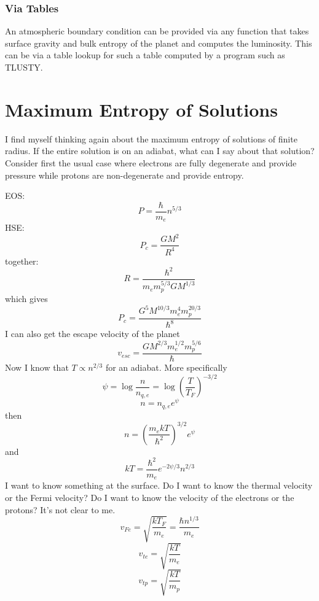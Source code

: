 \documentclass{emulateapj}
\begin{document}
\subsubsection{Via Tables}

An atmospheric boundary condition can be provided via any function
that takes surface gravity and bulk entropy of the planet and computes
the luminosity.  This can be via a table lookup for such a table
computed by a program such as TLUSTY.

\section{Maximum Entropy of Solutions}

I find myself thinking again about the maximum entropy of solutions of
finite radius.  If the entire solution is on an adiabat, what can I
say about that solution?  Consider first the usual case where
electrons are fully degenerate and provide pressure while protons are
non-degenerate and provide entropy.  

EOS:
\begin{equation}
  P = \frac{\hbar}{m_e} n^{5/3}
\end{equation}
HSE:
\begin{equation}
  P_c = \frac{G M^2}{R^4}
\end{equation}
together:
\begin{equation}
  R = \frac{\hbar^2}{m_e m_p^{5/3} G M^{1/3}}
\end{equation}
which gives
\begin{equation}
  P_c = \frac{G^5 M^{10/3} m_e^4 m_p^{20/3}}{\hbar^8}
\end{equation}
I can also get the escape velocity of the planet
\begin{equation}
  v_{esc} = \frac{G M^{2/3} m_e^{1/2} m_p^{5/6}}{\hbar}
\end{equation}
Now I know that $T\propto n^{2/3}$ for an adiabat.  More specifically
\begin{equation}
  \psi = \log \frac{n}{n_{q,e}} = \log \left(\frac{T}{T_F}\right)^{-3/2}
\end{equation}
\begin{equation}
  n = n_{q,e} e^\psi
\end{equation}
then
\begin{equation}
  n = \left(\frac{m_e k T}{\hbar^2}\right)^{3/2} e^\psi
\end{equation}
and
\begin{equation}
  kT = \frac{\hbar^2}{m_e} e^{-2\psi/3} n^{2/3}
\end{equation}
I want to know something at the surface.  Do I want to know the
thermal velocity or the Fermi velocity?  Do I want to know the
velocity of the electrons or the protons?  It's not clear to me.
\begin{equation}
  v_{Fe} = \sqrt{\frac{k T_F}{m_e}} = \frac{\hbar n^{1/3}}{m_e}
\end{equation}
\begin{equation}
  v_{te} = \sqrt{\frac{k T}{m_e}}
\end{equation}
\begin{equation}
  v_{tp} = \sqrt{\frac{k T}{m_p}}
\end{equation}
\end{document}
